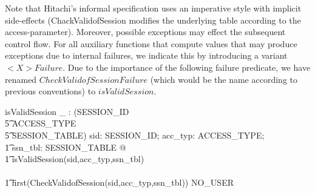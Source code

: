 \documentclass[a4paper,pdftex]{article}
\begin{document}
Note that Hitachi's informal specification uses an
imperative style with implicit side-effects (ChackValidofSession modifies the
underlying table according to the access-parameter).  Moreover,
possible exceptions may effect the subsequent control flow. For all
auxiliary functions that compute values that may produce exceptions due
to internal failures, we indicate this by introducing a
variant $<X>Failure$. Due to the importance of the following 
failure predicate, we have renamed $CheckValidofSessionFailure$ (which
would be the name according to previous conventions) to $isValidSession$.

\begin{axdef}
isValidSession \_ : \power(SESSION\_ID \cross \\
\t5                         ACCESS\_TYPE \cross \\
\t5                         SESSION\_TABLE)
\where
\forall sid: SESSION\_ID; acc\_typ: ACCESS\_TYPE; \\
\t1 ssn\_tbl: SESSION\_TABLE @ \\
\t1 isValidSession(sid,acc\_typ,ssn\_tbl)\\
 \iff \\
\t1 first(CheckValidofSession(sid,acc\_typ,ssn\_tbl)) \neq NO\_USER 
\end{axdef}
\end{document}
